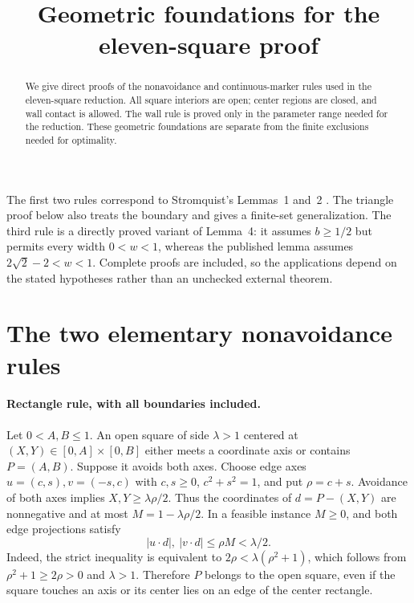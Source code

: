 \documentclass[11pt]{article}
\title{Geometric foundations for the eleven-square proof}
\author{}
\date{}
\begin{document}
\maketitle
\begin{abstract}
We give direct proofs of the nonavoidance and continuous-marker rules used
in the eleven-square reduction. All square interiors are open; center
regions are closed, and wall contact is allowed. The wall rule is proved
only in the parameter range needed for the reduction. These geometric
foundations are separate from the finite exclusions needed for optimality.
\end{abstract}

The first two rules correspond to Stromquist's Lemmas~1 and~2
\cite[ p.~2]{stromquist}. The triangle proof below also treats the boundary
and gives a finite-set generalization. The third rule is a directly proved variant of Lemma~4: it assumes
$b\ge1/2$ but permits every width $0<w<1$, whereas the published
lemma assumes $2\sqrt2-2<w<1$. Complete proofs are included, so the applications
depend on the stated hypotheses rather than an unchecked external theorem.

\section*{The two elementary nonavoidance rules}
\paragraph{Rectangle rule, with all boundaries included.}
Let $0<A,B\le1$. An open square of side $\lambda>1$ centered at
$(X,Y)\in[0,A]\times[0,B]$ either meets a coordinate axis or contains
$P=(A,B)$. Suppose it avoids both axes. Choose edge axes
$u=(c,s),v=(-s,c)$ with $c,s\ge0$, $c^2+s^2=1$, and put $\rho=c+s$.
Avoidance of both axes implies $X,Y\ge\lambda\rho/2$. Thus the
coordinates of $d=P-(X,Y)$ are nonnegative and at most
$M=1-\lambda\rho/2$. In a feasible instance $M\ge0$, and both edge
projections satisfy
\[
 |u\cdot d|,\ |v\cdot d|\le\rho M<\lambda/2.
\]
Indeed, the strict inequality is equivalent to
$2\rho<\lambda(\rho^2+1)$, which follows from
$\rho^2+1\ge2\rho>0$ and $\lambda>1$. Therefore $P$ belongs to the
open square, even if the square touches an axis or its center lies on
an edge of the center rectangle.
\end{document}
